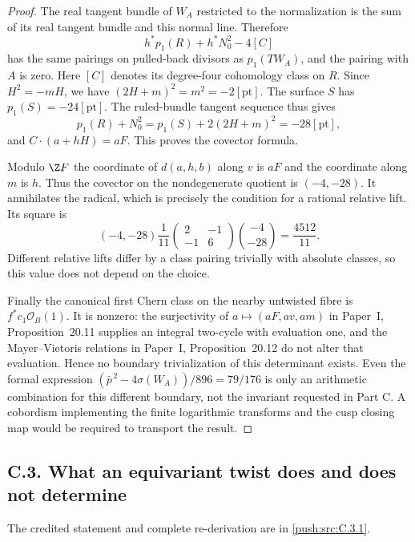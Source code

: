 \begin{proof}
The real tangent bundle of $W_A$ restricted to the normalization is
the sum of its real tangent bundle and this normal line. Therefore
\[
 h^*p_1(R)+h^*N_0^2-4[C]
\]
has the same pairings on pulled-back divisors as $p_1(TW_A)$, and
the pairing with $A$ is zero. Here $[C]$ denotes its degree-four
cohomology class on $R$. Since $H^2=-mH$, we have
$(2H+m)^2=m^2=-2[\mathrm{pt}]$. The surface $S$ has
$p_1(S)=-24[\mathrm{pt}]$. The ruled-bundle tangent sequence thus
gives
\[
 p_1(R)+N_0^2=p_1(S)+2(2H+m)^2=-28[\mathrm{pt}],
\]
and $C\cdot(a+hH)=aF$. This proves the covector formula.

Modulo $\Z F$ the coordinate of $d(a,h,b)$ along $v$ is $aF$
and the coordinate along $m$ is $h$. Thus the covector on the
nondegenerate quotient is $(-4,-28)$. It annihilates the radical,
which is precisely the condition for a rational relative lift.
Its square is
\[
 (-4,-28)\frac1{11}
 \begin{pmatrix}2&-1\\-1&6\end{pmatrix}
 \binom{-4}{-28}=\frac{4512}{11}.
\]
Different relative lifts differ by a class pairing trivially with
absolute classes, so this value does not depend on the choice.

Finally the canonical first Chern class on the nearby untwisted
fibre is $f^*c_1\mathcal O_B(1)$. It is nonzero: the surjectivity of
$a\mapsto(aF,av,am)$ in Paper~I, Proposition~20.11 supplies an integral two-cycle with
evaluation one, and the Mayer--Vietoris relations in Paper~I, Proposition~20.12 do not
alter that evaluation. Hence no boundary trivialization of this
determinant exists. Even the formal expression
$(\bar p^{\,2}-4\sigma(W_A))/896=79/176$ is only an arithmetic
combination for this different boundary, not the invariant requested
in Part C. A cobordism implementing the finite logarithmic transforms
and the cusp closing map would be required to transport the result.
\end{proof}


\subsection{C.3. What an equivariant twist does and does not determine}

The credited statement and complete re-derivation are in \cref{push:src:C.3.1}.
